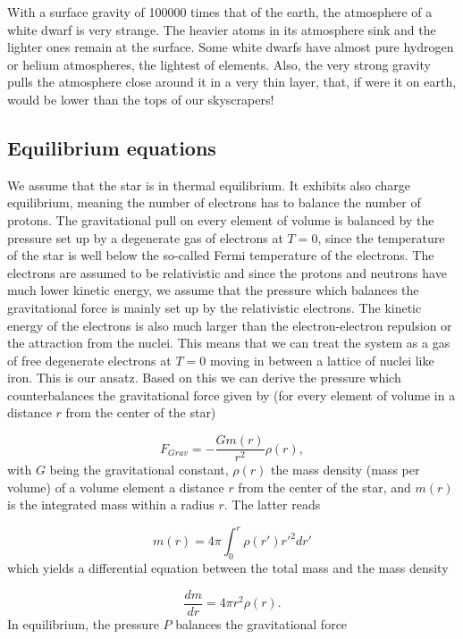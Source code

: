 \documentclass[%
oneside,                 %
final,                   %
10pt]{article}
\begin{document}
With a surface gravity of 100000 times that of the earth, the atmosphere of 
a white dwarf is very strange. The heavier atoms in its atmosphere sink and the lighter ones remain at the surface. 
Some white dwarfs have almost pure hydrogen or helium atmospheres, the lightest of elements. 
Also, the very strong gravity pulls the atmosphere close around it in a very thin layer, that, 
if were it on earth, would be lower than the tops of our skyscrapers!

\subsection{Equilibrium equations}

We assume that the star is in thermal equilibrium. It exhibits also charge equilibrium, meaning the number of electrons has to balance the number of protons. The gravitational pull 
on every element of volume is balanced by the pressure set up by a degenerate gas of electrons
at $T=0$, since the temperature of the star is well below the so-called Fermi temperature of the 
electrons. 
The electrons are assumed to be relativistic and since the protons and neutrons have much lower
kinetic energy, we assume that the pressure which balances the gravitational force is mainly
set up by the relativistic electrons. The kinetic energy of the electrons is also much larger
than the electron-electron repulsion or the attraction from the nuclei. This means that we can treat 
the system as a gas of free degenerate electrons at $T=0$ moving in between a lattice of nuclei like  
iron. This is our ansatz. 
Based on this we can derive the pressure which counterbalances the gravitational force given by
(for every element of volume in a distance $r$ from the center of the star)

\begin{equation*}
F_{Grav}=-\frac{Gm(r)}{r^{2}}\rho(r),
\end{equation*}
with $G$ being the  gravitational constant, $\rho (r)$ the mass density  (mass per volume) of a volume
element a distance $r$ from the center of the star,
and  $m(r)$ is the integrated mass within a radius $r$. The latter reads

\begin{equation*}
m(r)=4\pi\int_{0}^{r}\rho (r')r'^{2}dr'
\end{equation*}
which yields a differential equation between the total mass and the mass density

\begin{equation*}
\frac{dm}{dr}=4\pi r^{2}\rho (r).
\end{equation*}
In equilibrium, the pressure $P$ balances the gravitational force
\end{document}

